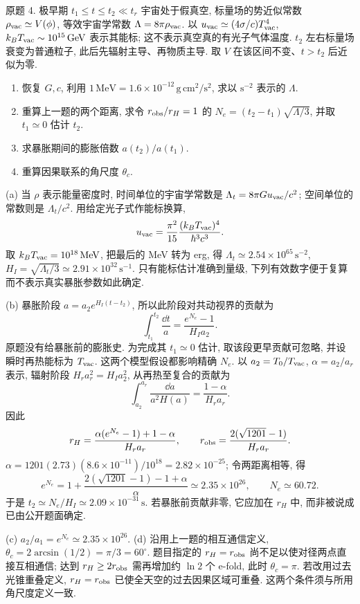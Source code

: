 \begin{exercise}\label{ps:9.4}
原题 4. 极早期 $t_1\le t\le t_2\ll t_r$ 宇宙处于假真空, 标量场的势近似常数 $\rho_{\rm vac}\simeq V(\phi)$, 等效宇宙学常数 $\Lambda=8\pi\rho_{\rm vac}$. 以 $u_{\rm vac}\simeq(4\sigma/c)T_{\rm vac}^4$, $k_BT_{\rm vac}\sim10^{15}\,\mathrm{GeV}$ 表示其能标; 这不表示真空真的有光子气体温度. $t_2$ 左右标量场衰变为普通粒子, 此后先辐射主导、再物质主导. 取 $V$ 在该区间不变、$t>t_2$ 后近似为零.
\begin{enumerate}[label=(\alph*)]
\item 恢复 $G,c$, 利用 $1\,\mathrm{MeV}=1.6\times10^{-12}\,\mathrm{g\,cm^2/s^2}$, 求以 $\mathrm{s^{-2}}$ 表示的 $\Lambda$.
\item 重算上一题的两个距离, 求令 $r_{\rm obs}/r_H=1$ 的 $N_e=(t_2-t_1)\sqrt{\Lambda/3}$, 并取 $t_1\simeq0$ 估计 $t_2$.
\item 求暴胀期间的膨胀倍数 $a(t_2)/a(t_1)$.
\item 重算因果联系的角尺度 $\theta_c$.
\end{enumerate}
\end{exercise}
\begin{solution}
(a) 当 $\rho$ 表示能量密度时, 时间单位的宇宙学常数是 $\Lambda_t=8\pi Gu_{\rm vac}/c^2$; 空间单位的常数则是 $\Lambda_t/c^2$. 用给定光子式作能标换算,
\[
u_{\rm vac}=\frac{\pi^2}{15}\frac{(k_BT_{\rm vac})^4}{\hbar^3c^3}.
\]
取 $k_BT_{\rm vac}=10^{18}\,\mathrm{MeV}$, 把最后的 MeV 转为 erg, 得
$\Lambda_t\simeq2.54\times10^{65}\,\mathrm{s^{-2}}$, $H_I=\sqrt{\Lambda_t/3}\simeq2.91\times10^{32}\,\mathrm{s^{-1}}$. 只有能标估计准确到量级, 下列有效数字便于复算而不表示真实暴胀参数如此确定.

(b) 暴胀阶段 $a=a_2e^{H_I(t-t_2)}$, 所以此阶段对共动视界的贡献为
\[
\int_{t_1}^{t_2}\frac{\dd t}{a}=
\frac{e^{N_e}-1}{H_Ia_2}.
\]
原题没有给暴胀前的膨胀史. 为完成其 $t_1\simeq0$ 估计, 取该段更早贡献可忽略, 并设瞬时再热能标为 $T_{\rm vac}$. 这两个模型假设都影响精确 $N_e$. 以 $a_2=T_0/T_{\rm vac}$, $\alpha=a_2/a_r$ 表示, 辐射阶段 $H_ra_r^2=H_Ia_2^2$, 从再热至复合的贡献为
\[
\int_{a_2}^{a_r}\frac{\dd a}{a^2H(a)}=
\frac{1-\alpha}{H_ra_r}.
\]
因此
\[
r_H=\frac{\alpha(e^{N_e}-1)+1-\alpha}{H_ra_r},\qquad
r_{\rm obs}=\frac{2(\sqrt{1201}-1)}{H_ra_r}.
\]
$\alpha=1201(2.73)(8.6\times10^{-11})/10^{18}=2.82\times10^{-25}$; 令两距离相等, 得
\[
e^{N_e}=1+\frac{2(\sqrt{1201}-1)-1+\alpha}{\alpha}
\simeq2.35\times10^{26},\qquad N_e\simeq60.72.
\]
于是 $t_2\simeq N_e/H_I\simeq2.09\times10^{-31}\,\mathrm{s}$. 若暴胀前贡献非零, 它应加在 $r_H$ 中, 而非被说成已由公开题面确定.

(c) $a_2/a_1=e^{N_e}\simeq2.35\times10^{26}$.
(d) 沿用上一题的相互通信定义, $\theta_c=2\arcsin(1/2)=\pi/3=60^\circ$. 题目指定的 $r_H=r_{\rm obs}$ 尚不足以使对径两点直接互相通信; 达到 $r_H\ge2r_{\rm obs}$ 需再增加约 $\ln2$ 个 e-fold, 此时 $\theta_c=\pi$. 若改用过去光锥重叠定义, $r_H=r_{\rm obs}$ 已使全天空的过去因果区域可重叠. 这两个条件须与所用角尺度定义一致.
\end{solution}

